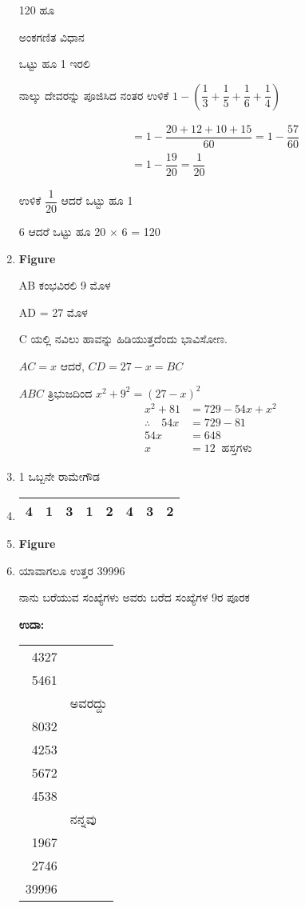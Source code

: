 \begin{enumerate}
120 ಹೂ

\smallskip
ಅಂಕಗಣಿತ ವಿಧಾನ 

ಒಟ್ಟು ಹೂ 1 ಇರಲಿ 

ನಾಲ್ಕು ದೇವರನ್ನು ಪೂಜಿಸಿದ ನಂತರ ಉಳಿಕೆ $1 - \left(\dfrac{1}{3} + \dfrac{1}{5} + \dfrac{1}{6} + \dfrac{1}{4}\right)$

\begin{align*}
& = 1 - \dfrac{20 + 12 + 10 + 15}{60} = 1 - \dfrac{57}{60}\\
& = 1 - \dfrac{19}{20} = \dfrac{1}{20}
\end{align*}

ಉಳಿಕೆ $\dfrac{1}{20}$ ಆದರೆ ಒಟ್ಟು ಹೂ 1

6 ಆದರೆ ಒಟ್ಟು ಹೂ 20 $\times$ 6 = 120

\item 
\begin{center}
{\bf Figure}
\end{center}

AB ಕಂಭವಿರಲಿ 9 ಮೊಳ 

AD = 27 ಮೊಳ 

C ಯಲ್ಲಿ  ನವಿಲು ಹಾವನ್ನು ಹಿಡಿಯುತ್ತದೆಂದು ಭಾವಿಸೋಣ.

$AC = x$ ಆದರೆ, \qquad $CD = 27 - x = BC$

$ABC$ ತ್ರಿಭುಜದಿಂದ \qquad $x^{2} + 9^{2} = (27 - x)^{2}$
\begin{align*}
x^{2} + 81 & = 729 - 54x + x^{2}\\
\therefore\quad 54x & = 729 - 81\\
54x & = 648\\
x & = 12 ~\text{ ಹಸ್ತಗಳು}
\end{align*}

\item 1 ಒಬ್ಬನೇ ರಾಮೇಗೌಡ 

\item 
\begin{tabular}{|c|c|c|c|c|c|c|c|}
\hline
4 & 1 & 3 & 1 & 2 & 4 & 3 & 2\\
\hline
\end{tabular}

\item 
\begin{center}
{\bf Figure}
\end{center}

\item ಯಾವಾಗಲೂ ಉತ್ತರ 39996

ನಾನು ಬರೆಯುವ ಸಂಖ್ಯೆಗಳು ಅವರು ಬರೆದ ಸಂಖ್ಯೆಗಳ 9ರ ಪೂರಕ 

{\bf ಉದಾ:}
\begin{tabular}[t]{rl}
4327& \\[-0.15cm]
5461 & \\[-0.3cm]
& ಅವರದ್ದು\\[-0.3cm]
8032 & \\[-0.15cm]
4253 & \\[0.15cm]
5672 & \\[-0.15cm]
4538 & \\[-0.3cm]
& ನನ್ನವು\\[-0.3cm]
1967 & \\[-0.15cm]
2746 & \\
\hline
39996 & 
\end{tabular}


\end{enumerate}
